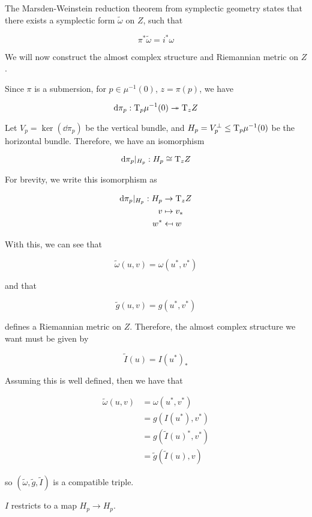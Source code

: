 \documentclass{article}
\renewcommand{\tilde}{\widetilde}
\newcommand{\surj}{\twoheadrightarrow}
\begin{document}
The Marsden-Weinstein reduction theorem from symplectic geometry states that there exists a symplectic form \(\tilde\omega\) on \(Z\), such that

\[\pi^*\tilde\omega = i^*\omega\]

We will now construct the almost complex structure and Riemannian metric on \(Z\).

Since \(\pi\) is a submersion, for \(p \in \mu^{-1}(0)\), \(z = \pi(p)\), we have

\[\dd\pi_p : \TT_p\mu^{-1}(0) \surj \TT_zZ\]

Let \(V_p = \ker(\dd\pi_p)\) be the vertical bundle, and \(H_p = V_p^\perp \le \mathrm{T}_p\mu^{-1}(0)\) be the horizontal bundle. Therefore, we have an isomorphism

\[\dd\pi_p\vert_{H_p} : H_p \cong \mathrm{T}_zZ\]

For brevity, we write this isomorphism as

\begin{align*}
    \dd\pi_p\vert_{H_p} : H_p &\to \mathrm{T}_zZ \\
    v &\mapsto v_* \\
    w^* &\mapsfrom w
\end{align*}

With this, we can see that

\[\tilde\omega(u, v) = \omega(u^*, v^*)\]

and that

\[\tilde g(u, v) = g(u^*, v^*)\]

defines a Riemannian metric on \(Z\). Therefore, the almost complex structure we want must be given by

\[\tilde I(u) = I(u^*)_*\]

Assuming this is well defined, then we have that

\begin{align*}
    \tilde\omega(u, v) &= \omega(u^*, v^*) \\
    &= g(I(u^*), v^*) \\
    &= g(\tilde I(u)^*, v^*) \\
    &= \tilde g(\tilde I(u), v)
\end{align*}

so \((\tilde\omega, \tilde g, \tilde I)\) is a compatible triple.

\begin{lemma*}
    \(I\) restricts to a map \(H_p \to H_p\).
\end{lemma*}
\end{document}
